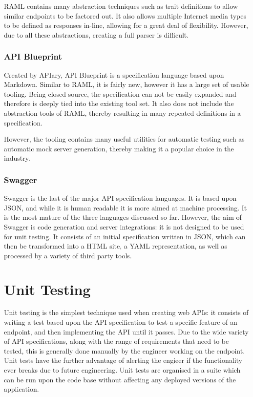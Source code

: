 RAML contains many abstraction techniques such as trait definitions to allow similar endpoints to be factored out. It also allows multiple Internet media types to be defined as responses in-line, allowing for a great deal of flexibility. However, due to all these abstractions, creating a full parser is difficult.

\subsubsection{API Blueprint}

Created by APIary, API Blueprint\cite{blueprintsite} is a specification language based upon Markdown. Similar to RAML, it is fairly new, however it has a large set of usable tooling. Being closed source, the specification can not be easily expanded and therefore is deeply tied into the existing tool set. It also does not include the abstraction tools of RAML, thereby resulting in many repeated definitions in a specification.

However, the tooling contains many useful utilities for automatic testing such as automatic mock server generation, thereby making it a popular choice in the industry.

\subsubsection{Swagger}

Swagger\cite{swaggersite} is the last of the major API specification languages. It is based upon JSON, and while it is human readable it is more aimed at machine processing. It is the most mature of the three languages discussed so far. However, the aim of Swagger is code generation and server integrations: it is not designed to be used for unit testing. It consists of an initial specification written in JSON, which can then be transformed into a HTML site, a YAML representation, as well as processed by a variety of third party tools.



\section{Unit Testing}

Unit testing is the simplest technique used when creating web APIs: it consists of writing a test based upon the API specification to test a specific feature of an endpoint, and then implementing the API until it passes. Due to the wide variety of API specifications, along with the range of requirements that need to be tested, this is generally done manually by the engineer working on the endpoint. Unit tests have the further advantage of alerting the engieer if the functionality ever breaks due to future engineering. Unit tests are organised in a suite which can be run upon the code base without affecting any deployed versions of the application.


